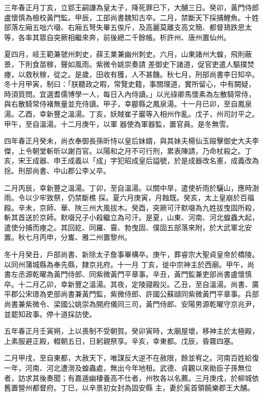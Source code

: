 \begin{pinyinscope}
 三年春正月丁亥，立郢王嗣謙為皇太子，降死罪已下，大酺三日。癸卯，黃門侍郎盧懷慎為檢校黃門監。甲辰，工部尚書魏知古卒。二月，禁斷天下採捕鯉魚。十姓部落左廂五咄六啜、右廂五弩失畢五俟斤，及高麗莫離支高文簡、都督鳷跌思太等，各率其眾自突厥相繼來奔，前後總二千餘帳。析許州、唐州置仙州。



 夏四月，岐王範兼虢州刺史，薛王業兼幽州刺史。六月，山東諸州大蝗，飛則蔽景，下則食苗稼，聲如風雨。紫微令姚崇奏請
 差御史下諸道，促官吏遣人驅撲焚瘞，以救秋稼，從之。是歲，田收有獲，人不甚饑。秋七月，刑部尚書李日知卒。冬十月甲寅，制曰：「朕聽政之暇，常覽史籍，事關理道，實所留心，中有闕疑，時須質問。宜選耆儒博學一人，每日入內侍讀。」以光祿卿馬懷素為左散騎常侍，與右散騎常侍褚無量並充侍讀。甲子，幸郿縣之鳳泉湯。十一月已卯，至自鳳泉湯。乙酉，幸新豐之溫湯。丁亥，妖賊崔子巖等入相州作亂。戊子，州司討平之。甲午，至自溫湯。十二月庚午，以軍
 器使為軍器監，置官員。是冬無雪。



 四年春正月癸未，尚衣奉御長孫昕恃以皇后妹婿，與其妹夫楊仙玉毆擊御史大夫李傑，上令朝堂斬昕以謝百官。以陽和之月不可行刑，累表陳請，乃命杖殺之。丁亥，宋王成器、申王成義以「成」字犯昭成皇后謚號，於是成器改名憲，成義改為捴。刑部尚書、中山郡公李乂卒。



 二月丙辰，幸新豐之溫湯。丁卯，至自溫湯。以關中旱，遣使祈雨於驪山，應時澍雨。令以少牢致祭，仍禁斷樵
 採。夏六月庚寅，月蝕既。癸亥，太上皇崩於百福殿。辛未，京師、華、陜三州大風拔木。癸酉，突厥可汗默啜為九姓拔曳固所殺，斬其首送於京師。默啜兄子小殺繼立為可汗。是夏，山東、河南、河北蝗蟲大起，遣使分捕而瘞之。其回紇、同羅、霫、勃曳固、僕固五部落來附，於大武軍北安置。秋七月丙申，分巂、雅二州置黎州。



 冬十月癸丑，戶部尚書、新除太子詹事畢構卒。庚午，葬睿宗大聖貞皇帝於橋陵。以同州蒲城縣為奉先縣，隸京兆府。十一月
 丁亥，徙中宗神主於西廟。甲午，尚書左丞源乾曜為黃門侍郎、同紫微黃門平章事。辛丑，黃門監兼吏部尚書盧懷慎卒。十二月乙卯，幸新豐之溫湯。其夜，定陵寢殿災。乙丑，至自溫湯。尚書、廣平郡公宋璟為吏部尚書兼黃門監，紫微侍郎、許國公蘇頲同紫微黃門平章事。兵部尚書兼紫微令、梁國公姚崇為開府儀同三司，黃門侍郎、安陽男源乾曜守京兆尹，並罷知政事。停十道採訪使。



 五年春正月壬寅朔，上以喪制不受朝賀。癸卯寅時，太廟屋壞，移神主於太極殿，上素服避正殿，輟朝五日，日躬親祭享。辛亥，幸東都。戊辰，昏霧四塞。



 二月甲戌，至自東都，大赦天下，唯謀反大逆不在赦限，餘並宥之。河南百姓給復一年，河南、河北遭澇及蝗蟲處，無出今年地租。武德、貞觀以來勛臣子孫無位者，訪求其後奏聞；有嘉遁幽棲養高不仕者，州牧各以名薦。三月庚戌，於柳城依舊置營州都督府。丁巳，以辛景初女封為固安縣
 主，妻於奚首領饒樂郡王大酺。




\end{pinyinscope}

